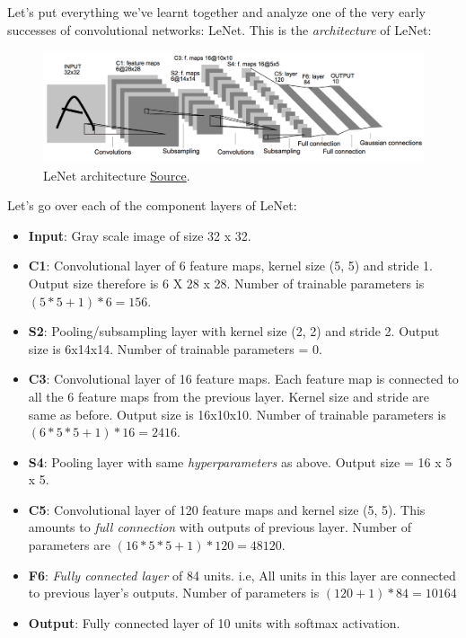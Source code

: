 \documentclass[a4paper]{tufte-handout}
\begin{document}
Let's put everything we've learnt together and analyze one of the very
early successes  of convolutional networks: LeNet. This
is the \emph{architecture} of LeNet:

\begin{figure}
\includegraphics[width=150mm]{lenet.png}
\caption{LeNet architecture
\href{http://yann.lecun.com/exdb/publis/pdf/lecun-01a.pdf}{Source}. }
\end{figure}

Let's go over each of the component layers of LeNet:

\begin{itemize}
\item
  \textbf{Input}: Gray scale image of size 32 x 32.
\item
  \textbf{C1}: Convolutional layer of 6 feature maps, kernel size (5, 5)
  and stride 1. Output size therefore is 6 X 28 x 28. Number of
  trainable parameters is \((5*5 + 1) * 6 = 156\).
\item
  \textbf{S2}: Pooling/subsampling layer with kernel size (2, 2) and
  stride 2. Output size is 6x14x14. Number of trainable parameters =
  0.
\item
  \textbf{C3}: Convolutional layer of 16 feature maps. Each feature map
  is connected to all the 6 feature maps from the previous layer. Kernel
  size and stride are same as before. Output size is 16x10x10.
  Number of trainable parameters is \((6 * 5 * 5 + 1) * 16 = 2416\).
\item
  \textbf{S4}: Pooling layer with same \emph{hyperparameters} as above.
  Output size = 16 x 5 x 5.
\item
  \textbf{C5}: Convolutional layer of 120 feature maps and kernel size
  (5, 5). This amounts to \emph{full connection} with outputs of
  previous layer. Number of parameters are
  \((16 * 5 * 5 + 1)*120 = 48120\).
\item
  \textbf{F6}: \emph{Fully connected layer} of 84 units. i.e, All units
  in this layer are connected to previous layer's
  outputs. Number of parameters is \((120 + 1)*84 = 10164\)
\item
  \textbf{Output}: Fully connected layer of 10 units with softmax
  activation.
\end{itemize}
\end{document}
